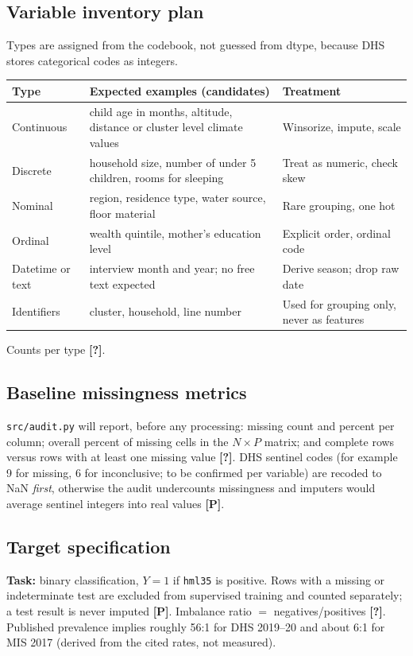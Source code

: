 \documentclass[11pt,a4paper]{article}
\newcommand{\Pl}{\textbf{[P]}}   %
\newcommand{\Q}{\textbf{[?]}}   %
\begin{document}
\subsection{Variable inventory plan}
Types are assigned from the codebook, not guessed from dtype, because DHS stores categorical codes as integers.
\begin{center}\small
\begin{tabular}{@{}p{2.6cm}p{5.2cm}p{6.5cm}@{}}\toprule
Type & Expected examples (candidates) & Treatment\\\midrule
Continuous & child age in months, altitude, distance or cluster level climate values & Winsorize, impute, scale\\
Discrete & household size, number of under 5 children, rooms for sleeping & Treat as numeric, check skew\\
Nominal & region, residence type, water source, floor material & Rare grouping, one hot\\
Ordinal & wealth quintile, mother's education level & Explicit order, ordinal code\\
Datetime or text & interview month and year; no free text expected & Derive season; drop raw date\\
Identifiers & cluster, household, line number & Used for grouping only, never as features\\\bottomrule
\end{tabular}\end{center}
Counts per type \Q.

\subsection{Baseline missingness metrics}
\texttt{src/audit.py} will report, before any processing: missing count and percent per column; overall percent of missing cells in the $N\times P$ matrix; and complete rows versus rows with at least one missing value \Q. DHS sentinel codes (for example 9 for missing, 6 for inconclusive; to be confirmed per variable) are recoded to NaN \emph{first}, otherwise the audit undercounts missingness and imputers would average sentinel integers into real values \Pl.

\subsection{Target specification}
\textbf{Task:} binary classification, $Y=1$ if \texttt{hml35} is positive. Rows with a missing or indeterminate test are excluded from supervised training and counted separately; a test result is never imputed \Pl. Imbalance ratio $=$ negatives/positives \Q. Published prevalence implies roughly 56:1 for DHS 2019--20 and about 6:1 for MIS 2017 (derived from the cited rates, not measured).
\end{document}
